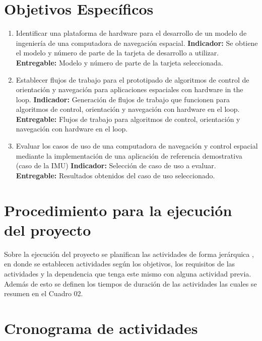 \documentclass[12pt]{article}
\begin{document}
\section{Objetivos Específicos}

\begin{enumerate}
  \item Identificar una plataforma de hardware para el desarrollo de un modelo de ingeniería de una computadora de navegación espacial. \newline
        \textbf{Indicador:} Se obtiene el modelo y número de parte de la tarjeta de desarrollo a utilizar.\newline
        \textbf{Entregable:} Modelo y número de parte de la tarjeta seleccionada.
  \item Establecer flujos de trabajo para el prototipado de algoritmos de control de orientación y navegación para aplicaciones espaciales con hardware in the loop. \newline
        \textbf{Indicador:} Generación de flujos de trabajo que funcionen para algoritmos de control, orientación y navegación con hardware en el loop.\newline
        \textbf{Entregable:} Flujos de trabajo para algoritmos de control, orientación y navegación con hardware en el loop.
  \item Evaluar los casos de uso de una computadora de navegación y control espacial mediante la implementación de una aplicación de referencia demostrativa (caso de la IMU) \newline
        \textbf{Indicador:} Selección de caso de uso a evaluar.\newline
        \textbf{Entregable:} Resultados obtenidos del caso de uso seleccionado.
\end{enumerate}

\section{Procedimiento para la ejecución del proyecto}

Sobre la ejecución del proyecto se planifican las actividades de forma jerárquica , en donde se establecen actividades según los objetivos, los requisitos de las actividades y la dependencia que tenga este mismo con alguna actividad previa. Además de esto se definen los tiempos de duración de las actividades las cuales se resumen en el Cuadro 02.


\section{Cronograma de actividades}
\end{document}
